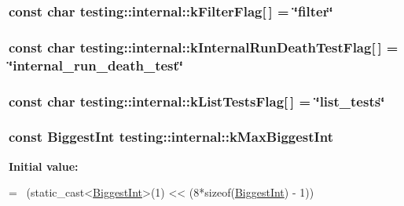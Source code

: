 \subsubsection[{k\+Filter\+Flag}]{\setlength{\rightskip}{0pt plus 5cm}const char testing\+::internal\+::k\+Filter\+Flag\mbox{[}$\,$\mbox{]} = \char`\"{}filter\char`\"{}}\label{namespacetesting_1_1internal_a8cb8ee7fe7659e6916a0108dffa2f7dc}
\hypertarget{namespacetesting_1_1internal_a8572303d929880adf30db00952e1c45d}{}
\subsubsection[{k\+Internal\+Run\+Death\+Test\+Flag}]{\setlength{\rightskip}{0pt plus 5cm}const char testing\+::internal\+::k\+Internal\+Run\+Death\+Test\+Flag\mbox{[}$\,$\mbox{]} = \char`\"{}internal\+\_\+run\+\_\+death\+\_\+test\char`\"{}}\label{namespacetesting_1_1internal_a8572303d929880adf30db00952e1c45d}
\hypertarget{namespacetesting_1_1internal_a1d3cfebffefbf35f7033d4941493a8ff}{}
\subsubsection[{k\+List\+Tests\+Flag}]{\setlength{\rightskip}{0pt plus 5cm}const char testing\+::internal\+::k\+List\+Tests\+Flag\mbox{[}$\,$\mbox{]} = \char`\"{}list\+\_\+tests\char`\"{}}\label{namespacetesting_1_1internal_a1d3cfebffefbf35f7033d4941493a8ff}
\hypertarget{namespacetesting_1_1internal_ad901880198832bc166d2493096b451f7}{}
\subsubsection[{k\+Max\+Biggest\+Int}]{\setlength{\rightskip}{0pt plus 5cm}const {\bf Biggest\+Int} testing\+::internal\+::k\+Max\+Biggest\+Int}\label{namespacetesting_1_1internal_ad901880198832bc166d2493096b451f7}
{\bfseries Initial value\+:}
\begin{DoxyCode}
=
    ~(\textcolor{keyword}{static\_cast<}\hyperlink{namespacetesting_1_1internal_a05c6bd9ede5ccdf25191a590d610dcc6}{BiggestInt}\textcolor{keyword}{>}(1) << (8*\textcolor{keyword}{sizeof}(\hyperlink{namespacetesting_1_1internal_a05c6bd9ede5ccdf25191a590d610dcc6}{BiggestInt}) - 1))
\end{DoxyCode}
\hypertarget{namespacetesting_1_1internal_a128515c8ed6c0fe98e498c8042da2060}{}
